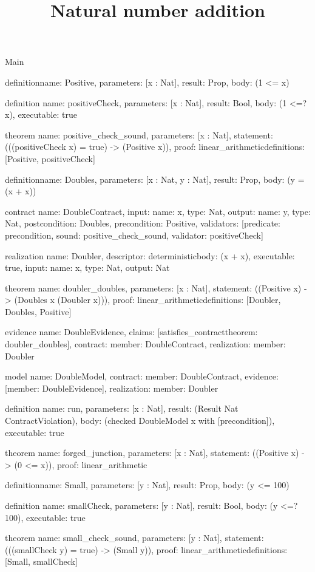 \begin{lexlean}{Main}
\title{Natural number addition}
\begin{semanticmodule}
definition{name: Positive, parameters: [x : Nat], result: Prop, body: (1 <= x)}

definition{
  name: positiveCheck,
  parameters: [x : Nat],
  result: Bool,
  body: (1 <=? x),
  executable: true
}

theorem{
  name: positive_check_sound,
  parameters: [x : Nat],
  statement: (((positiveCheck x) = true) -> (Positive x)),
  proof: linear_arithmetic{definitions: [Positive, positiveCheck]}
}

definition{name: Doubles, parameters: [x : Nat, y : Nat], result: Prop, body: (y = (x + x))}

contract{
  name: DoubleContract,
  input: {name: x, type: Nat},
  output: {name: y, type: Nat},
  postcondition: Doubles,
  precondition: Positive,
  validators: [{predicate: precondition, sound: positive_check_sound, validator: positiveCheck}]
}

realization{
  name: Doubler,
  descriptor: deterministic{body: (x + x)},
  executable: true,
  input: {name: x, type: Nat},
  output: Nat
}

theorem{
  name: doubler_doubles,
  parameters: [x : Nat],
  statement: ((Positive x) -> (Doubles x (Doubler x))),
  proof: linear_arithmetic{definitions: [Doubler, Doubles, Positive]}
}

evidence{
  name: DoubleEvidence,
  claims: [satisfies_contract{theorem: doubler_doubles}],
  contract: {member: DoubleContract},
  realization: {member: Doubler}
}

model{
  name: DoubleModel,
  contract: {member: DoubleContract},
  evidence: [{member: DoubleEvidence}],
  realization: {member: Doubler}
}

definition{
  name: run,
  parameters: [x : Nat],
  result: (Result Nat ContractViolation),
  body: (checked DoubleModel x with [precondition]),
  executable: true
}

theorem{
  name: forged_junction,
  parameters: [x : Nat],
  statement: ((Positive x) -> (0 <= x)),
  proof: linear_arithmetic{}
}

definition{name: Small, parameters: [y : Nat], result: Prop, body: (y <= 100)}

definition{
  name: smallCheck,
  parameters: [y : Nat],
  result: Bool,
  body: (y <=? 100),
  executable: true
}

theorem{
  name: small_check_sound,
  parameters: [y : Nat],
  statement: (((smallCheck y) = true) -> (Small y)),
  proof: linear_arithmetic{definitions: [Small, smallCheck]}
}


\end{semanticmodule}
\end{lexlean}
